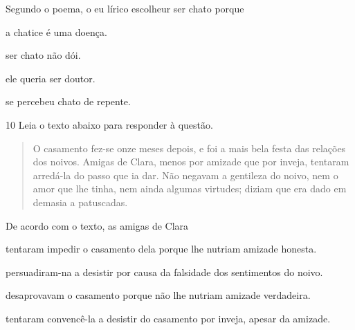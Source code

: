 
Segundo o poema, o eu lírico escolheur ser chato porque 

\begin{escolha}

  \item a chatice é uma doença.
  
  \item ser chato não dói.
  
  \item ele queria ser doutor.
  
  \item se percebeu chato de repente.

\end{escolha}

\num{10} Leia o texto abaixo para responder à questão. 

\begin{quote}

O casamento fez-se onze meses depois, e foi a mais bela festa das
relações dos noivos. Amigas de Clara, menos por amizade que por
inveja, tentaram arredá-la do passo que ia dar. Não negavam a gentileza
do noivo, nem o amor que lhe tinha, nem ainda algumas virtudes; diziam
que era dado em demasia a patuscadas.

\end{quote}


De acordo com o texto, as amigas de Clara

\begin{escolha}

    \item tentaram impedir o casamento dela porque lhe nutriam amizade honesta.

    \item persuadiram-na a desistir por causa da falsidade dos sentimentos do noivo.  

    \item desaprovavam o casamento porque não lhe nutriam amizade verdadeira.

    \item tentaram convencê-la a desistir do casamento por inveja, apesar da amizade.

\end{escolha}

